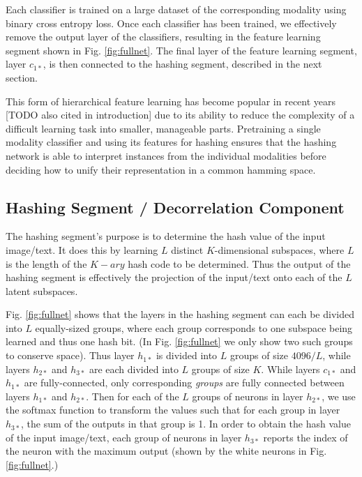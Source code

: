 \documentclass[letterpaper]{article}
\begin{document}
Each classifier is trained on a large dataset of the corresponding modality using binary cross entropy loss. Once each classifier has been trained, we effectively remove the output layer of the classifiers, resulting in the feature learning segment shown in Fig. \ref{fig:fullnet}. The final layer of the feature learning segment, layer $ c_{1*} $, is then connected to the hashing segment, described in the next section.

This form of hierarchical feature learning has become popular in recent years \cite{dvsh,dcmh,autoen,chn,cdq} [TODO also cited in introduction] due to its ability to reduce the complexity of a difficult learning task into smaller, manageable parts. Pretraining a single modality classifier and using its features for hashing ensures that the hashing network is able to interpret instances from the individual modalities before deciding how to unify their representation in a common hamming space.

\subsection{Hashing Segment / Decorrelation Component}

The hashing segment's purpose is to determine the hash value of the input image/text. It does this by learning $ L $ distinct $ K $-dimensional subspaces, where $ L $ is the length of the $K-ary$ hash code to be determined. Thus the output of the hashing segment is effectively the projection of the input/text onto each of the $ L $ latent subspaces.

Fig. \ref{fig:fullnet} shows that the layers in the hashing segment can each be divided into $ L $ equally-sized groups, where each group corresponds to one subspace being learned and thus one hash bit. (In Fig. \ref{fig:fullnet} we only show two such groups to conserve space). Thus layer $h_{1*}$ is divided into $L$ groups of size $4096/L$, while layers $h_{2*}$ and $h_{3*}$ are each divided into $L$ groups of size $K$. While layers $c_{1*}$ and $h_{1*}$ are fully-connected, only corresponding \emph{groups} are fully connected between layers $h_{1*}$ and $h_{2*}$. Then for each of the $ L $ groups of neurons in layer $h_{2*}$, we use the softmax function to transform the values such that for each group in layer $h_{3*}$, the sum of the outputs in that group is 1. In order to obtain the hash value of the input image/text, each group of neurons in layer $h_{3*}$ reports the index of the neuron with the maximum output (shown by the white neurons in Fig. \ref{fig:fullnet}.)
\end{document}
